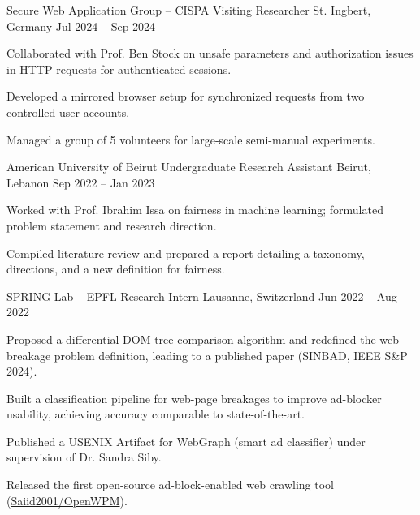 \begin{cventries}
\cventry
    {Secure Web Application Group -- CISPA} %
    {Visiting Researcher} %
    {St. Ingbert, Germany} %
    {Jul 2024 -- Sep 2024} %
    {
      \begin{cvitems} %
        \item {Collaborated with Prof. Ben Stock on unsafe parameters and authorization issues in HTTP requests for authenticated sessions.}
        \item {Developed a mirrored browser setup for synchronized requests from two controlled user accounts.}
        \item {Managed a group of 5 volunteers for large-scale semi-manual experiments.}
      \end{cvitems}
    }

  \cventry
    {American University of Beirut} %
    {Undergraduate Research Assistant} %
    {Beirut, Lebanon} %
    {Sep 2022 -- Jan 2023} %
    {
      \begin{cvitems} %
        \item {Worked with Prof. Ibrahim Issa on fairness in machine learning; formulated problem statement and research direction.}
        \item {Compiled literature review and prepared a report detailing a taxonomy, directions, and a new definition for fairness.}
      \end{cvitems}
    }

  \cventry
    {SPRING Lab -- EPFL} %
    {Research Intern} %
    {Lausanne, Switzerland} %
    {Jun 2022 -- Aug 2022} %
    {
      \begin{cvitems} %
        \item {Proposed a differential DOM tree comparison algorithm and redefined the web-breakage problem definition, leading to a published paper (SINBAD, IEEE S\&P 2024).}
        \item {Built a classification pipeline for web-page breakages to improve ad-blocker usability, achieving accuracy comparable to state-of-the-art.}
        \item {Published a USENIX Artifact for WebGraph (smart ad classifier) under supervision of Dr. Sandra Siby.}
        \item {Released the first open-source ad-block-enabled web crawling tool (\href{https://www.github.com/Saiid2001/OpenWPM}{Saiid2001/OpenWPM}).}
      \end{cvitems}
    }


\end{cventries}
